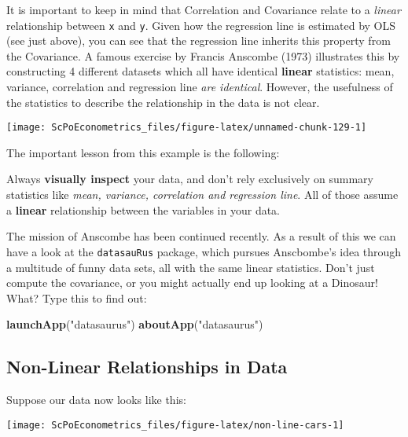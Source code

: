 \documentclass[]{book}
\newenvironment{Shaded}{\begin{snugshade}}{\end{snugshade}}
\newcommand{\KeywordTok}[1]{\textcolor[rgb]{0.13,0.29,0.53}{\textbf{#1}}}
\newcommand{\StringTok}[1]{\textcolor[rgb]{0.31,0.60,0.02}{#1}}
\newcommand{\NormalTok}[1]{#1}
\newenvironment{warning}{\begin{tcolorbox}[colback=orange!5!white,colframe=orange]}{\end{tcolorbox}}
\begin{document}
It is important to keep in mind that Correlation and Covariance relate
to a \emph{linear} relationship between \texttt{x} and \texttt{y}. Given
how the regression line is estimated by OLS (see just above), you can
see that the regression line inherits this property from the Covariance.
A famous exercise by Francis Anscombe (1973) illustrates this by
constructing 4 different datasets which all have identical
\textbf{linear} statistics: mean, variance, correlation and regression
line \emph{are identical}. However, the usefulness of the statistics to
describe the relationship in the data is not clear.

\begin{center}\texttt{[image: ScPoEconometrics\_files/figure-latex/unnamed-chunk-129-1]} \end{center}

The important lesson from this example is the following:

\begin{warning}
Always \textbf{visually inspect} your data, and don't rely exclusively
on summary statistics like \emph{mean, variance, correlation and
regression line}. All of those assume a \textbf{linear} relationship
between the variables in your data.
\end{warning}

 The mission of Anscombe has been continued recently. As a result of
this we can have a look at the \texttt{datasauRus} package, which
pursues Anscbombe's idea through a multitude of funny data sets, all
with the same linear statistics. Don't just compute the covariance, or
you might actually end up looking at a Dinosaur! What? Type this to find
out:

\begin{Shaded}
\begin{Highlighting}[]
\KeywordTok{launchApp}\NormalTok{(}\StringTok{"datasaurus"}\NormalTok{)}
\KeywordTok{aboutApp}\NormalTok{(}\StringTok{"datasaurus"}\NormalTok{)}
\end{Highlighting}
\end{Shaded}

\subsection{Non-Linear Relationships in
Data}\label{non-linear-relationships-in-data}

Suppose our data now looks like this:

\begin{center}\texttt{[image: ScPoEconometrics\_files/figure-latex/non-line-cars-1]} \end{center}
\end{document}
